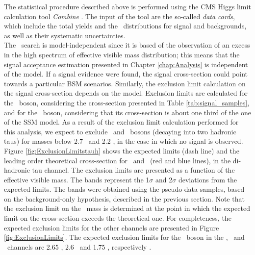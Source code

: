 \noindent The statistical procedure described above is performed using 
the CMS Higgs limit calculation tool \textit{Combine} \cite{CombinedTool}. The input
of the tool are the so-called \textit{data cards}, which include the total 
yields and the \mass~distributions for signal and backgrounds, as well
as their systematic uncertainties. \\

\noindent The \Zprime~search is model-independent since it is based of the observation
of an excess in the high spectrum of effective visible mass distribution; this means that 
the signal acceptance estimation presented in Chapter \ref{chap:Analysis}
is independent of the model. If a signal evidence were found, the signal cross-section 
could point towards a particular BSM scenarios. Similarly, the 
exclusion limit calculation on the signal cross-section depends
on the model. Exclusion limits are calculated for the \ZprimeSSM~boson,
considering the cross-section presented in Table \ref{tab:signal_samples}, and 
for the \ZprimeTAT~boson, considering that its cross-section is about one third of 
the one of the SSM model. As a result of the exclusion limit calculation performed for this 
analysis, we expect to exclude \ZprimeSSM~and \ZprimeTAT~bosons (decaying into two hadronic taus)
for masses below 2.7 \TeV~and 2.2 \TeV, in the case in which no signal is observed.\\

\noindent Figure \ref{fig:ExclusionLimitstauh} shows the expected limits (dash line) 
and the leading order theoretical cross-section for \ZprimeSSM~and \ZprimeTAT~(red and blue lines),
in the di-hadronic tau channel. The exclusion limits are presented as a function of 
the effective visible mass. The bands represent the 1$\sigma$
and 2$\sigma$ deviations from the expected limits. The bands were obtained 
using the pseudo-data samples, based on the background-only hypothesis, described 
in the previous section. Note that the exclusion limit on the \Zprime~mass
is determined at the point in which the expected limit on the cross-section 
exceeds the theoretical one. For completeness, the expected exclusion limits 
for the other channels are presented in Figure \ref{fig:ExclusionLimits}. The 
expected exclusion limits for the \ZprimeSSM~boson in the \tauh\taumu, \tauh\taue~and \taue\taumu~channels
are 2.65 \TeV, 2.6 \TeV~and 1.75 \TeV, respectively \cite{AN2018}. 
 
